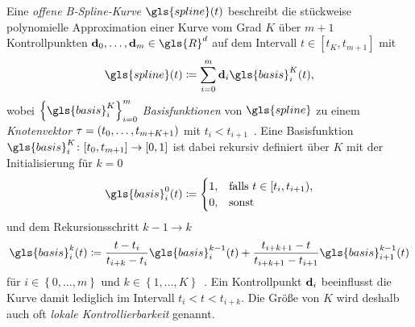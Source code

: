 Eine \emph{offene B-Spline-Kurve} $\gls{spline}\left(t\right)$ beschreibt die stückweise polynomielle Approximation einer Kurve vom Grad $K$ über $m + 1$ Kontrollpunkten $\ve{d}_0, \ldots, \ve{d}_m \in \gls{R}^d$ auf dem Intervall $t \in \left[t_K, t_{m+1}\right]$ mit
\begin{equation}
  \gls{spline}\left(t\right) \coloneqq \sum_{i = 0}^m \ve{d}_i \gls{basis}_i^K\left(t\right),
    \label{eq:bspline}
\end{equation}
wobei ${\left\{\gls{basis}_i^K\right\}}_{i=0}^m$ \emph{Basisfunktionen} von $\gls{spline}$ zu einem \emph{Knotenvektor} $\ve{\tau} = \left(t_0, \ldots, t_{m+K+1}\right)$ mit $t_i < t_{i+1}$~\cite{deBoor}.
Eine Basisfunktion $\gls{basis}_i^K \colon \left[t_0, t_{m+1}\right] \to \left[0, 1\right]$ ist dabei rekursiv definiert über $K$ mit der Initialisierung für $k=0$
\begin{equation}
  \gls{basis}_i^0\left(t\right) \coloneqq \begin{cases}
    1, & \text{falls }t \in \left[t_i, t_{i+1}\right),\\
    0, & \text{sonst}
    \label{eq:bspline_basis_init}
  \end{cases}
\end{equation}
und dem Rekursionsschritt $k - 1 \rightarrow k$
\begin{equation}
  \gls{basis}_i^k\left(t\right) \coloneqq \frac{t-t_i}{t_{i+k} - t_i}\gls{basis}^{k-1}_i\left(t\right) + \frac{t_{i+k+1} - t}{t_{i+k+1} - t_{i+1}} \gls{basis}_{i+1}^{k-1}\left(t\right)
    \label{eq:bspline_basis_schritt}
\end{equation}
für $i \in \left\{ 0, \ldots, m \right\}$ und $k \in \left\{1, \ldots, K \right\}$~\cite{deBoor}.
Ein Kontrollpunkt $\mathbf{d}_i$ beeinflusst die Kurve damit lediglich im Intervall $t_i < t < t_{i+k}$.
Die Größe von $K$ wird deshalb auch oft \emph{lokale Kontrollierbarkeit} genannt.

